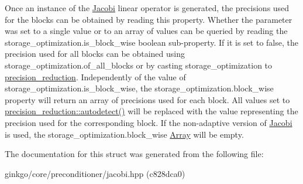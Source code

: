 Once an instance of the \hyperlink{classgko_1_1preconditioner_1_1Jacobi}{Jacobi} linear operator is generated, the precisions used for the blocks can be obtained by reading this property. Whether the parameter was set to a single value or to an array of values can be queried by reading the {\ttfamily storage\+\_\+optimization.\+is\+\_\+block\+\_\+wise} boolean sub-\/property. If it is set to {\ttfamily false}, the precision used for all blocks can be obtained using {\ttfamily storage\+\_\+optimization.\+of\+\_\+all\+\_\+blocks} or by casting {\ttfamily storage\+\_\+optimization} to {\ttfamily \hyperlink{classgko_1_1precision__reduction}{precision\+\_\+reduction}}. Independently of the value of {\ttfamily storage\+\_\+optimization.\+is\+\_\+block\+\_\+wise}, the {\ttfamily storage\+\_\+optimization.\+block\+\_\+wise} property will return an array of precisions used for each block. All values set to {\ttfamily \hyperlink{classgko_1_1precision__reduction_ac4109c61fadb24db7a1888c51ac483e9}{precision\+\_\+reduction\+::autodetect()}} will be replaced with the value representing the precision used for the corresponding block. If the non-\/adaptive version of \hyperlink{classgko_1_1preconditioner_1_1Jacobi}{Jacobi} is used, the {\ttfamily storage\+\_\+optimization.\+block\+\_\+wise} \hyperlink{classgko_1_1Array}{Array} will be empty. 

The documentation for this struct was generated from the following file\+:\begin{DoxyCompactItemize}
\item 
ginkgo/core/preconditioner/jacobi.\+hpp (c828dca0)\end{DoxyCompactItemize}

